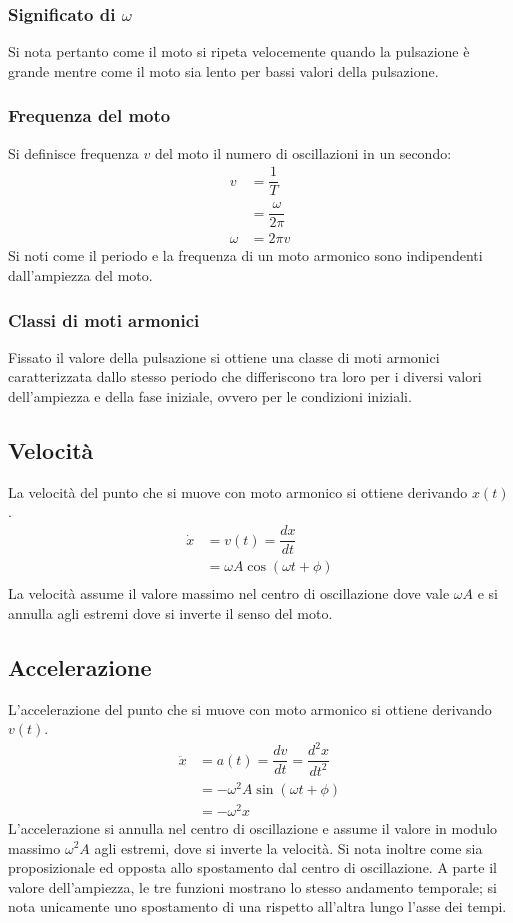 \documentclass[class=book, crop=false, oneside, 12pt]{standalone}
\begin{document}
		\subsubsection{Significato di $\omega$}
		Si nota pertanto come il moto si ripeta velocemente quando la pulsazione \`e grande mentre come il moto sia lento per bassi valori della pulsazione.
		\subsubsection{Frequenza del moto}
		Si definisce frequenza $v$ del moto il numero di oscillazioni in un secondo:
		\begin{align*}
			v &= \dfrac{1}{T}\\
			  &= \dfrac{\omega}{2\pi}\\
			\omega &= 2\pi v
		\end{align*}
		Si noti come il periodo e la frequenza di un moto armonico sono indipendenti dall'ampiezza del moto.
		\subsubsection{Classi di moti armonici}
		Fissato il valore della pulsazione si ottiene una classe di moti armonici caratterizzata dallo stesso periodo che differiscono tra loro per i diversi valori dell'ampiezza e della fase iniziale, ovvero per le condizioni iniziali.
	\subsection{Velocit\`a}
	La velocit\`a del punto che si muove con moto armonico si ottiene derivando $x(t)$.
	\begin{align*}
		\dot{x} &= v(t) = \dfrac{dx}{dt}\\
		  &=\omega A \cos(\omega t+\phi)\\
	\end{align*}
	La velocit\`a assume il valore massimo nel centro di oscillazione dove vale $\omega A$ e si annulla agli estremi dove si inverte il senso del moto.
	\subsection{Accelerazione}
	L'accelerazione del punto che si muove con moto armonico si ottiene derivando $v(t)$.
	\begin{align*}
		\ddot{x} &= a(t) = \dfrac{dv}{dt} = \dfrac{d^2x}{dt^2}\\
		       &= -\omega^2 A \sin(\omega t + \phi)\\
		       &= -\omega^2 x
	\end{align*}
	L'accelerazione si annulla nel centro di oscillazione e assume il valore in modulo massimo $\omega^2 A$ agli estremi, dove si inverte la velocit\`a.
	Si nota inoltre come sia proposizionale ed opposta allo spostamento dal centro di oscillazione.
	A parte il valore dell'ampiezza, le tre funzioni mostrano lo stesso andamento temporale; si nota unicamente uno spostamento di una rispetto all'altra lungo l'asse dei tempi.
	
\end{document}
